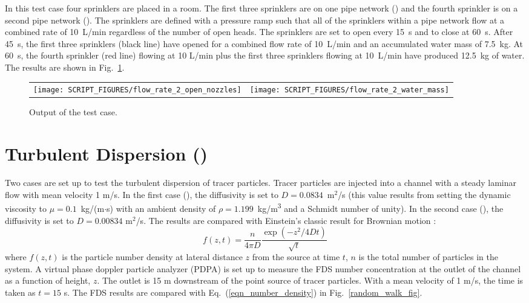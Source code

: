 \documentclass[11pt]{book}
\begin{document}
In this test case four sprinklers are placed in a room.  The first three sprinklers are on one pipe network () and the fourth sprinkler is on a second pipe network ().  The sprinklers are defined with a pressure ramp such that all of the sprinklers within a pipe network flow at a combined rate of 10~L/min regardless of the number of open heads.  The sprinklers are set to open every 15~s and to close at 60~s.  After 45~s, the first three sprinklers (black line) have opened for a combined flow rate of 10~L/min and an accumulated water mass of 7.5~kg.  At 60~s, the fourth sprinkler (red line) flowing at 10 L/min plus the first three sprinklers flowing at 10~L/min have produced 12.5~kg of water. The results are shown in Fig.~\ref{flow_rate_2_figure}.

\begin{figure}[ht]
\begin{tabular*}{\textwidth}{lr}
\texttt{[image: SCRIPT\_FIGURES/flow\_rate\_2\_open\_nozzles]} &
\texttt{[image: SCRIPT\_FIGURES/flow\_rate\_2\_water\_mass]}
\end{tabular*}
\caption[The  case]{Output of the  test case.}
\label{flow_rate_2_figure}
\end{figure}



\section{Turbulent Dispersion (\texorpdfstring{{}}{random\_walk}) }
\label{turbulent_dispersion}
\label{random_walk}

Two cases are set up to test the turbulent dispersion of tracer particles.  Tracer particles are injected into a channel with a steady laminar flow with mean velocity 1 m/s.  In the first case (), the diffusivity is set to $D=0.0834$~m$^2$/s (this value results from setting the dynamic viscosity to $\mu = 0.1$~kg/(m$\cdot$s) with an ambient density of $\rho=1.199$~\si{kg/m^3} and a Schmidt number of unity).  In the second case (), the diffusivity is set to $D=0.00834$ m$^2$/s.  The results are compared with Einstein's classic result for Brownian motion \cite{Gardiner:2004}:
\begin{equation}
\label{eqn_number_density}
f(z,t) = \frac{n}{4\pi D} \frac{\exp \left( -z^2/4Dt \right)}{\sqrt{t}}
\end{equation}
where $f(z,t)$ is the particle number density at lateral distance $z$ from the source at time $t$, $n$ is the total number of particles in the system.  A virtual phase doppler particle analyzer (PDPA) is set up to measure the FDS number concentration at the outlet of the channel as a function of height, $z$.  The outlet is 15 m downstream of the point source of tracer particles.  With a mean velocity of 1 m/s, the time is taken as $t = 15$ s.  The FDS results are compared with Eq.~(\ref{eqn_number_density}) in Fig.~\ref{random_walk_fig}.
\end{document}
